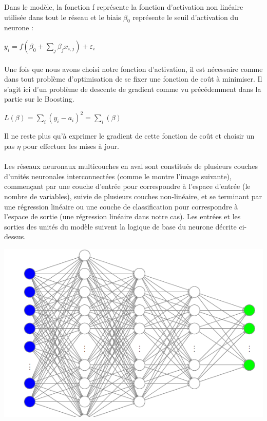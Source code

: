 \documentclass[14pt, openany]{article}
\begin{document}
Dans le modèle, la fonction f représente la fonction d'activation non linéaire utilisée dans tout le réseau et le biais $\beta_{0} $ représente le seuil d'activation du neurone :
\begin{center}
$y_{i}=f(\beta_{0} + \sum\limits_{j} \beta_{j}x_{i,j}) + \varepsilon_{i}$
\end{center}

\paragraph{}
Une fois que nous avons choisi notre fonction d'activation, il est nécessaire comme dans tout problème d'optimisation de se fixer une fonction de coût à minimiser. Il s'agit ici d'un problème de descente de gradient comme vu précédemment dans la partie sur le Boosting.

\begin{center}
$L(\beta)=\sum\limits_{i}(y_{i}-a_{i})^{2}=\sum\limits_{i}(\beta)$
\end{center}

Il ne reste plus qu'à exprimer le gradient de cette fonction de coût et choisir un pas $\eta$ pour effectuer les mises à jour.

\paragraph{}
Les réseaux neuronaux multicouches en aval sont constitués de plusieurs couches d'unités neuronales interconnectées (comme le montre l'image suivante), commençant par une couche d'entrée pour correspondre à l'espace d'entrée (le nombre de variables), suivie de plusieurs couches non-linéaire, et se terminant par une régression linéaire ou une couche de classification pour correspondre à l'espace de sortie (une régression linéaire dans notre cas). Les entrées et les sorties des unités du modèle suivent la logique de base du neurone décrite ci-dessus.

\begin{center}
\includegraphics[scale=0.7]{Images/RN.png}
\end{center}
\end{document}
